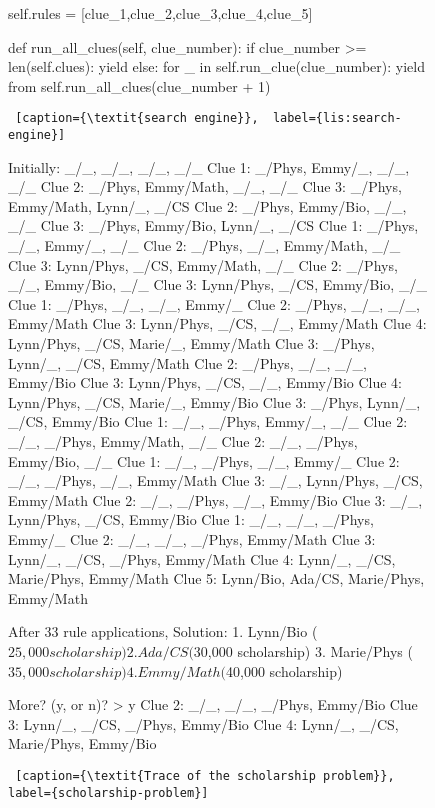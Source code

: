 \begin{figure}[!b]  %
    \flushright
\linv
\begin{minipage}[c]{0.45\textwidth}
\begin{python1}
self.rules = [clue_1,clue_2,clue_3,clue_4,clue_5]

def run_all_clues(self, clue_number):
  if clue_number >= len(self.clues): yield
  else:
    for _ in self.run_clue(clue_number):
      yield from self.run_all_clues(clue_number + 1)
\end{python1}\linv
\begin{lstlisting} [caption={\textit{search engine}},  label={lis:search-engine}]
\end{lstlisting}

\begin{python1}
Initially: _/_, _/_, _/_, _/_
Clue 1: _/Phys, Emmy/_, _/_, _/_
Clue 2: _/Phys, Emmy/Math, _/_, _/_
Clue 3: _/Phys, Emmy/Math, Lynn/_, _/CS
Clue 2: _/Phys, Emmy/Bio, _/_, _/_
Clue 3: _/Phys, Emmy/Bio, Lynn/_, _/CS
Clue 1: _/Phys, _/_, Emmy/_, _/_
Clue 2: _/Phys, _/_, Emmy/Math, _/_
Clue 3: Lynn/Phys, _/CS, Emmy/Math, _/_
Clue 2: _/Phys, _/_, Emmy/Bio, _/_
Clue 3: Lynn/Phys, _/CS, Emmy/Bio, _/_
Clue 1: _/Phys, _/_, _/_, Emmy/_
Clue 2: _/Phys, _/_, _/_, Emmy/Math
Clue 3: Lynn/Phys, _/CS, _/_, Emmy/Math
Clue 4: Lynn/Phys, _/CS, Marie/_, Emmy/Math
Clue 3: _/Phys, Lynn/_, _/CS, Emmy/Math
Clue 2: _/Phys, _/_, _/_, Emmy/Bio
Clue 3: Lynn/Phys, _/CS, _/_, Emmy/Bio
Clue 4: Lynn/Phys, _/CS, Marie/_, Emmy/Bio
Clue 3: _/Phys, Lynn/_, _/CS, Emmy/Bio
Clue 1: _/_, _/Phys, Emmy/_, _/_
Clue 2: _/_, _/Phys, Emmy/Math, _/_
Clue 2: _/_, _/Phys, Emmy/Bio, _/_
Clue 1: _/_, _/Phys, _/_, Emmy/_
Clue 2: _/_, _/Phys, _/_, Emmy/Math
Clue 3: _/_, Lynn/Phys, _/CS, Emmy/Math
Clue 2: _/_, _/Phys, _/_, Emmy/Bio
Clue 3: _/_, Lynn/Phys, _/CS, Emmy/Bio
Clue 1: _/_, _/_, _/Phys, Emmy/_
Clue 2: _/_, _/_, _/Phys, Emmy/Math
Clue 3: Lynn/_, _/CS, _/Phys, Emmy/Math
Clue 4: Lynn/_, _/CS, Marie/Phys, Emmy/Math
Clue 5: Lynn/Bio, Ada/CS, Marie/Phys, Emmy/Math

After 33 rule applications,
Solution: 
	1. Lynn/Bio	($25,000 scholarship)
	2. Ada/CS	($30,000 scholarship)
	3. Marie/Phys	($35,000 scholarship)
	4. Emmy/Math	($40,000 scholarship)

More? (y, or n)? > y
Clue 2: _/_, _/_, _/Phys, Emmy/Bio
Clue 3: Lynn/_, _/CS, _/Phys, Emmy/Bio
Clue 4: Lynn/_, _/CS, Marie/Phys, Emmy/Bio
\end{python1}\linv
\begin{lstlisting} [caption={\textit{Trace of the scholarship problem}}, label={scholarship-problem}]
\end{lstlisting}
\end{minipage}\linv
\end{figure}


